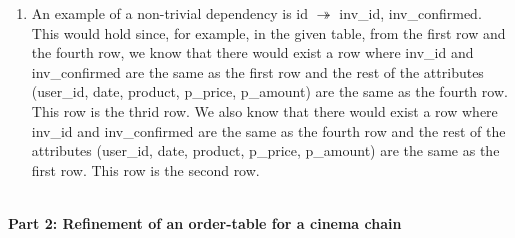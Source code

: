\documentclass[12pt]{article}
\begin{document}
\begin{enumerate}
  \item An example of a non-trivial dependency is id $\twoheadrightarrow$
        inv\_id, inv\_confirmed. This would hold since, for example, in the
        given table, from the first row and the fourth row, we know that there
        would exist a row where inv\_id and inv\_confirmed are the same as the
        first row and the rest of the attributes (user\_id, date, product,
        p\_price, p\_amount) are the same as the fourth row. This row is the
        thrid row. We also know that there would exist a row where inv\_id and
        inv\_confirmed are the same as the fourth row and the rest of the
        attributes (user\_id, date, product, p\_price, p\_amount) are the same
        as the first row. This row is the second row.
\end{enumerate}
\ \\


\textbf{Part 2: Refinement of an order-table for a cinema chain}
\end{document}
